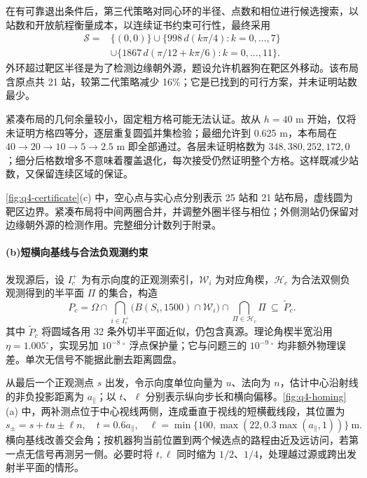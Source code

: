 在有可靠退出条件后，第三代策略对同心环的半径、点数和相位进行候选搜索，以站数和开放航程衡量成本，以连续证书约束可行性，最终采用
\begin{equation}\label{eq:q4-layout}
 \begin{aligned}
 \mathcal S={}&\{(0,0)\}\cup\{998\,d(k\pi/4):k=0,\ldots,7\}\\
 &\cup\{1867\,d(\pi/12+k\pi/6):k=0,\ldots,11\}.
 \end{aligned}
\end{equation}
外环超过靶区半径是为了检测边缘朝外源，题设允许机器狗在靶区外移动。该布局含原点共 21 站，较第二代策略减少 16\%；它是已找到的可行方案，并未证明站数最少。

紧凑布局的几何余量较小，固定粗方格可能无法认证。故从 $h=40$ m 开始，仅将未证明方格四等分，逐层重复圆弧并集检验；最细允许到 0.625 m，本布局在 $40\to20\to10\to5\to2.5$ m 即全部通过。各层未证明格数为 $348,380,252,172,0$；细分后格数增多不意味着覆盖退化，每次接受仍然证明整个方格。这样既减少站数，又保留连续区域的保证。

\cref{fig:q4-certificate}(c) 中，空心点与实心点分别表示 25 站和 21 站布局，虚线圆为靶区边界。紧凑布局将中间两圈合并，并调整外圈半径与相位；外侧测站仍保留对边缘朝外源的检测作用。完整细分计数列于附录。

\paragraph{\textbf{(b)}\hspace{0.2em}短横向基线与合法负观测约束}
发现源后，设 $I_c^+$ 为有示向度的正观测索引，$\mathcal W_i$ 为对应角楔，$\mathcal H_c$ 为合法双侧负观测得到的半平面 $\Pi$ 的集合，构造
\begin{equation}\label{eq:q4-region}
 P_c=\Omega\cap\bigcap_{i\in I_c^+}\bigl(B(S_i,1500)\cap\mathcal W_i\bigr)
       \cap\bigcap_{\Pi\in\mathcal H_c}\Pi\ \subseteq\ \widetilde P_c.
\end{equation}
其中 $\widetilde P_c$ 将圆域各用 32 条外切半平面近似，仍包含真源。理论角楔半宽沿用 $\eta=1.005^\circ$，实现另加 $10^{-8}\,{}^\circ$ 浮点保护量；它与问题三的 $10^{-9}\,{}^\circ$ 均非额外物理误差。单次无信号不能据此删去距离圆盘。

从最后一个正观测点 $s$ 出发，令示向度单位向量为 $u$、法向为 $n$，估计中心沿射线的非负投影距离为 $a_{\parallel}$；以 $t$、$\ell$ 分别表示纵向步长和横向偏移。\cref{fig:q4-homing}(a) 中，两补测点位于中心视线两侧，连成垂直于视线的短横截线段，其位置为
\begin{equation}\label{eq:q4-baseline}
 s_\pm=s+tu\pm\ell n,\quad t=0.6a_{\parallel},\quad
 \ell=\min\{100,\max(22,0.3\max(a_{\parallel},1))\}\ \mathrm{m}.
\end{equation}
横向基线改善交会角；按机器狗当前位置到两个候选点的路程由近及远访问，若第一点无信号再测另一侧。必要时将 $t,\ell$ 同时缩为 $1/2$、$1/4$，处理越过源或跨出发射半平面的情形。

